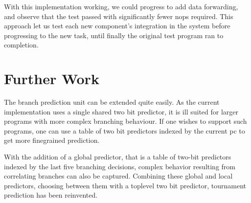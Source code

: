 With this implementation working, we could progress to add data forwarding, and observe that the test passed with significantly fewer nops required.
This approach let us test each new component's integration in the system before progressing to the new task, until finally the original test program ran to completion.

\section{Further Work}

The branch prediction unit can be extended quite easily.
As the current implementation uses a single shared two bit predictor, it is ill suited for larger programs with more complex branching behaviour.
If one wishes to support such programs, one can use a table of two bit predictors indexed by the current pc to get more finegrained prediction.

With the addition of a global predictor, that is a table of two-bit predictors indexed by the last five branching decisions, complex behavior resulting from correlating branches can also be captured.
Combining these global and local predictors, choosing between them with a toplevel two bit predictor, tournament prediction has been reinvented.
